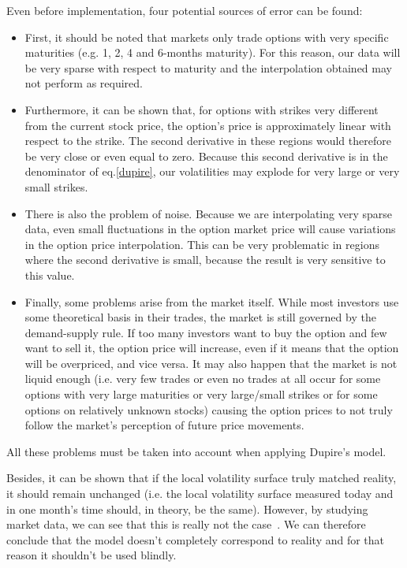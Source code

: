 Even before implementation, four potential sources of error can be found:
\begin{itemize}
\item First, it should be noted that markets only trade options with very specific maturities (e.g. 1, 2, 4 and 6-months maturity). For this reason, our data will be very sparse with respect to maturity and the interpolation obtained may not perform as required.
\item Furthermore, it can be shown that, for options with strikes very different from the current stock price, the option's price is approximately linear with respect to the strike. The second derivative in these regions would therefore be very close or even equal to zero. Because this second derivative is in the denominator of eq.\eqref{dupire}, our volatilities may explode for very large or very small strikes.
\item There is also the problem of noise. Because we are interpolating very sparse data, even small fluctuations in the option market price will cause variations in the option price interpolation. This can be very problematic in regions where the second derivative is small, because the result is very sensitive to this value.
\item Finally, some problems arise from the market itself. While most investors use some theoretical basis in their trades, the market is still governed by the demand-supply rule. If too many investors want to buy the option and few want to sell it, the option price will increase, even if it means that the option will be overpriced, and vice versa. It may also happen that the market is not liquid enough (i.e. very few trades or even no trades at all occur for some options with very large maturities or very large/small strikes or for some options on relatively unknown stocks) causing the option prices to not truly follow the market's perception of future price movements.
\end{itemize}
All these problems must be taken into account when applying Dupire's model.

Besides, it can be shown that if the local volatility surface truly matched reality, it should remain unchanged (i.e. the local volatility surface measured today and in one month's time should, in theory, be the same). However, by studying market data, we can see that this is really not the case~\cite{Wilmott3}. We can therefore conclude that the model doesn't completely correspond to reality and for that reason it shouldn't be used blindly.


